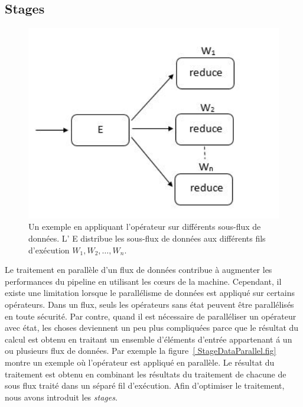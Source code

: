 \subsection{Stages}



\begin{figure}[ht]
\centering
     \includegraphics[width=1.0\textwidth]{Figures/StageDataParallel.jpg}
      \caption[Un exemple d'application de l'op\'erateur  sur diff\'erents sous-flux de donn\'ees.]{Un exemple en appliquant l'op\'erateur  sur diff\'erents sous-flux de donn\'ees. L' E distribue  les sous-flux de donn\'ees aux diff\'erents fils d'ex\'ecution $W_1, W_2, \ldots, W_n$.}
       \label{StageDataParallel.fig}
\end{figure}

Le traitement en parall\`ele d'un flux de donn\'ees contribue \`a augmenter les performances du pipeline en utilisant les cœurs de la machine. Cependant, il existe une limitation lorsque le parall\'elisme de donn\'ees est appliqu\'e sur certains op\'erateurs. Dans un flux, seuls les op\'erateurs sans \'etat peuvent \^etre parall\'elis\'es en toute s\'ecurit\'e. Par contre, quand il est n\'ecessaire de parall\'eliser un op\'erateur avec \'etat, les choses deviennent un peu plus compliqu\'ees parce que le r\'esultat du calcul est obtenu en traitant un ensemble d'\'el\'ements d'entrée appartenant \'a un ou plusieurs flux de donn\'ees. Par exemple la figure~\ref{ StageDataParallel.fig} montre un exemple o\`u l'op\'erateur  est appliqu\'e en parall\`ele. Le r\'esultat du traitement est obtenu en combinant les r\'esultats du traitement de chacune de sous flux trait\'e dans un s\'epar\'e fil d'ex\'ecution. Afin d'optimiser le traitement, nous avons introduit les \emph{stages}.


